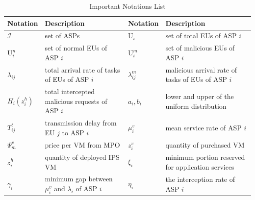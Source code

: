 \documentclass[10pt,journal, compsoc]{IEEEtran}
\begin{document}
\begin{table}[!t]
\centering
\caption{Important Notations List}
\label{notationlist}
\footnotesize
\begin{tabular}{ |p{} |p{} || p{} |p{}|} \hline
 Notation & Description & Notation & Description \\ \hline
 $\mathcal{I}$ & set of ASPs & $\mathrm{U}_i$ & set of total EUs of ASP $i$ \\ \hline
 $\mathrm{U}_i^n$ & set of normal EUs of ASP $i$ & $\mathrm{U}_i^m$ & set of malicious EUs of ASP $i$ \\ \hline
 $\lambda_{ij}$ & total arrival rate of tasks of EUs of ASP $i$ & $\lambda_{ij}^m$ & malicious arrival rate of tasks of EUs of ASP $i$ \\ \hline
$H_i(z_i^h)$ & total intercepted malicious requests of ASP $i$ & $a_i, b_i$ & lower and upper of the uniform distribution \\ \hline
 $T_{ij}^t$ & transmission delay from EU $j$ to ASP $i$ & $\mu_i^v$ & mean service rate of ASP $i$ \\ \hline
 $\Psi_m^v$ & price per VM from MPO & $z_i^v$ & quantity of purchased VM \\ \hline
 $z_i^h$ & quantity of deployed IPS VM & $\xi_i$ & minimum portion reserved for application services  \\ \hline
 $\gamma_i$ & minimum gap between $\mu_i^v$ and $\lambda_i$ of ASP $i$ & $\eta_i$ & the interception rate of ASP $i$ \\ \hline
\end{tabular}
\end{table}
\end{document}
